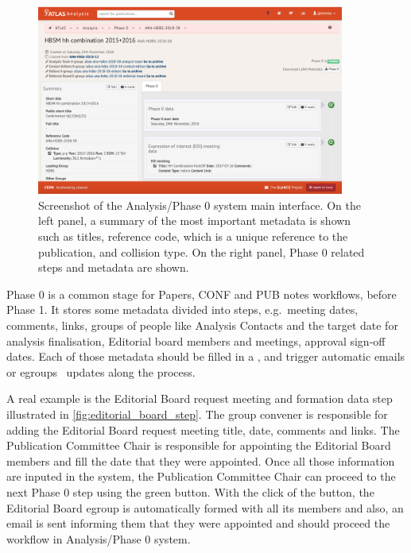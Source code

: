 \begin{figure}[htb]
  \centering
  \includegraphics[width=0.9\textwidth]{figures/Glance_Papers_Phase0.png}
  \caption{Screenshot of the Analysis/Phase 0 system main interface. On the left panel, a summary of the most important metadata is shown such as titles, reference code, which is a unique reference to the publication, and collision type. On the right panel, Phase 0 related steps and metadata are shown.}%
  \label{fig:Glance_Papers_Phase0}
\end{figure}

Phase 0 is a common stage for Papers, CONF and PUB notes workflows, before Phase 1.
It stores some metadata divided into steps, e.g.\ meeting dates, comments, links, groups of people like Analysis Contacts and the target date for analysis finalisation, Editorial board members and meetings, approval sign-off dates.
Each of those metadata should be filled in a ,
 and trigger automatic emails or egroups~\cite{egroups} updates along the process.

A real example is the Editorial Board request meeting and formation data step illustrated in \cref{fig:editorial_board_step}. The group convener is responsible for adding the Editorial Board request meeting title, date, comments and links. The Publication Committee Chair is responsible for appointing the Editorial Board members and fill the date that they were appointed. Once all those information are inputed in the system, the Publication Committee Chair can proceed to the next Phase 0 step using the green button. With the click of the button, the Editorial Board egroup is automatically formed with all its members and also, an email is sent informing them that they were appointed and should proceed the workflow in Analysis/Phase 0 system.

